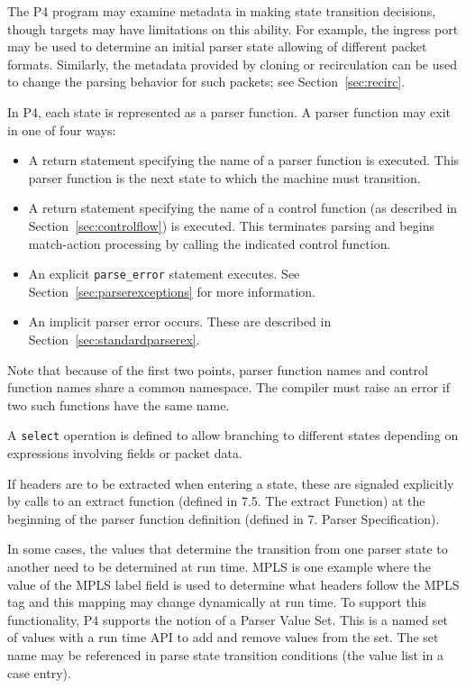 \documentclass[12pt]{article}
\begin{document}
The P4 program may examine metadata in making state transition decisions, 
though targets may have limitations on this ability.  For example, the ingress 
port may be used to determine an initial parser state allowing of different 
packet formats. Similarly, the metadata provided by cloning or recirculation 
can be used to change the parsing behavior for such packets; see 
Section~\ref{sec:recirc}.

In P4, each state is represented as a parser function. A parser function may 
exit in one of four ways:

\begin{itemize}
\item
A return statement specifying the name of a parser function is executed.  This 
parser function is the next state to which the machine must transition.
\item
A return statement specifying the name of a control function (as described 
in Section~\ref{sec:controlflow}) is executed. This terminates 
parsing and begins match-action processing by calling the indicated control 
function.
\item
An explicit \texttt{parse_error} statement executes. 
See Section~\ref{sec:parserexceptions} for more information.
\item
An implicit parser error occurs. These are described in 
Section~\ref{sec:standardparserex}.
\end{itemize}


Note that because of the first two points, parser function names and
control function names share a common namespace.  The compiler must
raise an error if two such functions have the same name.

A \texttt{select} operation is defined to allow branching to different
states depending on expressions involving fields or packet data.

If headers are to be extracted when entering a state, these are
signaled explicitly by calls to an extract function (defined in
7.5. The extract Function) at the beginning of the parser function
definition (defined in 7. Parser Specification).


In some cases, the values that determine the transition from one
parser state to another need to be determined at run time. MPLS is one
example where the value of the MPLS label field is used to determine
what headers follow the MPLS tag and this mapping may change
dynamically at run time. To support this functionality, P4 supports
the notion of a Parser Value Set. This is a named set of values with a
run time API to add and remove values from the set. The set name may
be referenced in parse state transition conditions (the value list in
a case entry).
\end{document}

